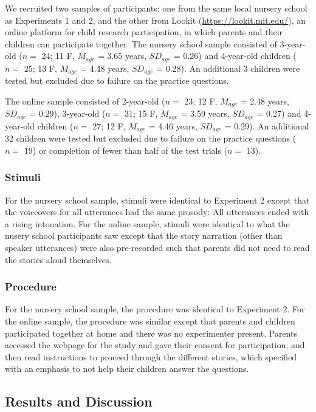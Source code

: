 \documentclass[10pt, letterpaper]{article}
\begin{document}
We recruited two samples of participants: one from the same local
nursery school as Experiments 1 and 2, and the other from Lookit
(\url{https://lookit.mit.edu/}), an online platform for child research
participation, in which parents and their children can participate
together. The nursery school sample consisted of 3-year-old (\(n=\) 24;
11 F, \(M_{age}\) = 3.65 years, \(SD_{age}\) = 0.26) and 4-year-old
children (\(n=\) 25; 13 F, \(M_{age}\) = 4.48 years, \(SD_{age}\) =
0.28). An additional 3 children were tested but excluded due to failure
on the practice questions.

The online sample consisted of 2-year-old (\(n=\) 23; 12 F, \(M_{age}\)
= 2.48 years, \(SD_{age}\) = 0.29), 3-year-old (\(n=\) 31; 15 F,
\(M_{age}\) = 3.59 years, \(SD_{age}\) = 0.27) and 4-year-old children
(\(n=\) 27; 12 F, \(M_{age}\) = 4.46 years, \(SD_{age}\) = 0.29). An
additional 32 children were tested but excluded due to failure on the
practice questions (\(n=\) 19) or completion of fewer than half of the
test trials (\(n=\) 13).

\subsubsection{Stimuli}\label{stimuli}

For the nursery school sample, stimuli were identical to Experiment 2
except that the voiceovers for all utterances had the same prosody: All
utterances ended with a rising intonation. For the online sample,
stimuli were identical to what the nusery school participants saw except
that the story narration (other than speaker utterances) were also
pre-recorded such that parents did not need to read the stories aloud
themselves.

\subsubsection{Procedure}\label{procedure-2}

For the nursery school sample, the procedure was identical to Experiment
2. For the online sample, the procedure was similar except that parents
and children participated together at home and there was no experimenter
present. Parents accessed the webpage for the study and gave their
consent for participation, and then read instructions to proceed through
the different stories, which specified with an emphasis to not help
their children answer the questions.

\subsection{Results and Discussion}\label{results-and-discussion-2}
\end{document}

